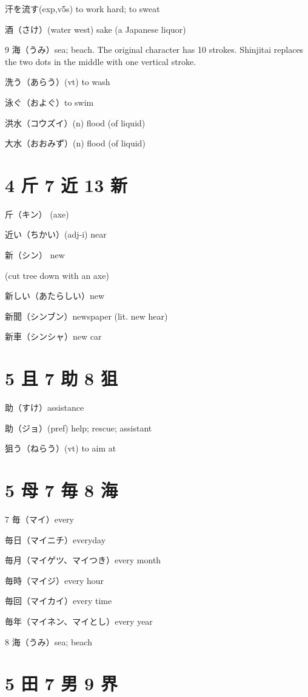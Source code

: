 汗を流す(exp,v5s) to work hard; to sweat

酒（さけ）(water west) sake (a Japanese liquor)

9 海（うみ）sea; beach.
The original character has 10 strokes.
Shinjitai replaces the two dots in the middle
with one vertical stroke.

洗う（あらう）(vt) to wash

泳ぐ（およぐ）to swim

洪水（コウズイ）(n) flood (of liquid)

大水（おおみず）(n) flood (of liquid)

\section{4 斤 7 近 13 新}

斤（キン） (axe)

近い（ちかい）(adj-i) near

新（シン） new

(cut tree down with an axe)

新しい（あたらしい）new

新聞（シンブン）newspaper (lit. new hear)

新車（シンシャ）new car

\section{5 且 7 助 8 狙}

助（すけ）assistance

助（ジョ）(pref) help; rescue; assistant

狙う（ねらう）(vt) to aim at

\section{5 母 7 毎 8 海}

7 毎（マイ）every

毎日（マイニチ）everyday

毎月（マイゲツ、マイつき）every month

毎時（マイジ）every hour

毎回（マイカイ）every time

毎年（マイネン、マイとし）every year

8 海（うみ）sea; beach

\section{5 田 7 男 9 界}

